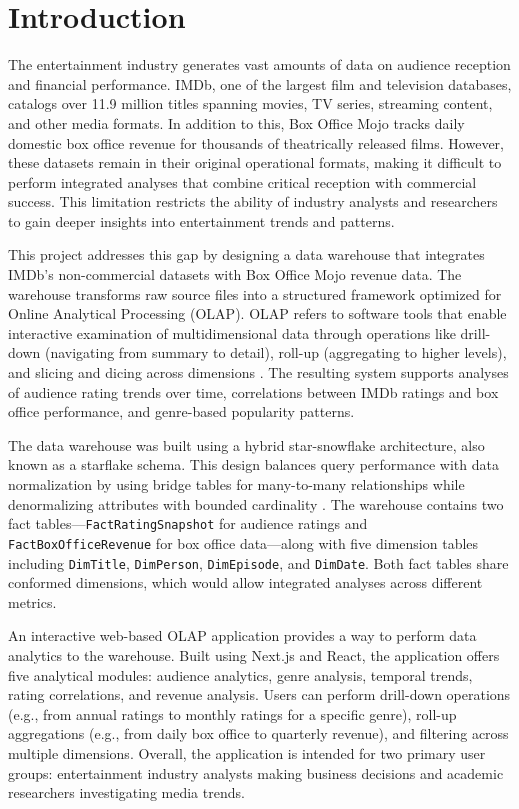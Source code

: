 \section{Introduction}

The entertainment industry generates vast amounts of data on audience reception and financial performance. IMDb, one of the largest film and television databases, catalogs over 11.9 million titles spanning movies, TV series, streaming content, and other media formats. In addition to this, Box Office Mojo tracks daily domestic box office revenue for thousands of theatrically released films. However, these datasets remain in their original operational formats, making it difficult to perform integrated analyses that combine critical reception with commercial success. This limitation restricts the ability of industry analysts and researchers to gain deeper insights into entertainment trends and patterns.

This project addresses this gap by designing a data warehouse that integrates IMDb's non-commercial datasets with Box Office Mojo revenue data. The warehouse transforms raw source files into a structured framework optimized for Online Analytical Processing (OLAP). OLAP refers to software tools that enable interactive examination of multidimensional data through operations like drill-down (navigating from summary to detail), roll-up (aggregating to higher levels), and slicing and dicing across dimensions \cite{codd1993olap}. The resulting system supports analyses of audience rating trends over time, correlations between IMDb ratings and box office performance, and genre-based popularity patterns.

The data warehouse was built using a hybrid star-snowflake architecture, also known as a starflake schema. This design balances query performance with data normalization by using bridge tables for many-to-many relationships while denormalizing attributes with bounded cardinality \cite{kimball2013datawarehouse}. The warehouse contains two fact tables—\texttt{FactRatingSnapshot} for audience ratings and \texttt{FactBoxOfficeRevenue} for box office data—along with five dimension tables including \texttt{DimTitle}, \texttt{DimPerson}, \texttt{DimEpisode}, and \texttt{DimDate}. Both fact tables share conformed dimensions, which would allow integrated analyses across different metrics.

An interactive web-based OLAP application provides a way to perform data analytics to the warehouse. Built using Next.js and React, the application offers five analytical modules: audience analytics, genre analysis, temporal trends, rating correlations, and revenue analysis. Users can perform drill-down operations (e.g., from annual ratings to monthly ratings for a specific genre), roll-up aggregations (e.g., from daily box office to quarterly revenue), and filtering across multiple dimensions. Overall, the application is intended for two primary user groups: entertainment industry analysts making business decisions and academic researchers investigating media trends.
